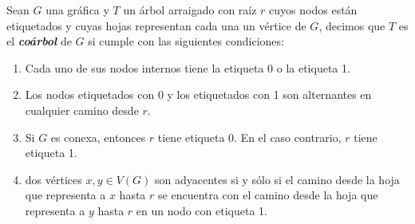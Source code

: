  Sean $G$ una gráfica y $T$ un árbol arraigado con raíz $r$ cuyos nodos están etiquetados y cuyas hojas representan cada una un vértice de $G$, decimos que $T$ es el \emph{\textbf{coárbol}} de $G$ si cumple con las siguientes condiciones: 
 \begin{enumerate}
     \item Cada uno de sus nodos internos tiene la etiqueta 0 o la etiqueta 1.
     \item Los nodos etiquetados con 0 y los etiquetados con 1 son alternantes en cualquier camino desde $r$.
     \item Si $G$ es conexa, entonces $r$ tiene etiqueta 0. En el caso contrario, $r$ tiene etiqueta 1.
     \item dos vértices $x,y \in V(G)$ son adyacentes si y sólo si el camino desde la hoja que representa a $x$ hasta $r$ se encuentra con el camino desde la hoja que representa a $y$ hasta $r$ en un nodo con etiqueta 1.
 \end{enumerate}
 
 
